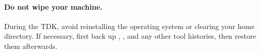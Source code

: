\paragraph{Do not wipe your machine.} During the TDK, avoid reinstalling the operating system or clearing your home directory. If necessary, first back up , ,  and any other tool histories, then restore them afterwards.
